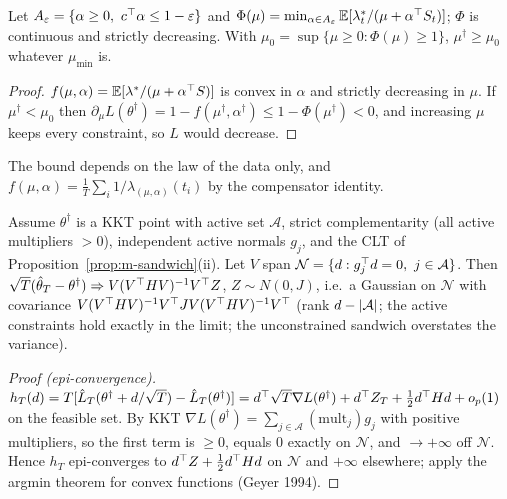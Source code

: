 \begin{proposition}\label{prop:m-mulow}\Pt{}
Let $A_\varepsilon=\{\alpha\ge0,\ c^{\top}\alpha\le1-\varepsilon\}$ and $\Phi(\mu)=\min_{\alpha\in A_\varepsilon}\mathbb{E}[\lambda^*_t/(\mu+\alpha^{\top} S_t)]$; $\Phi$ is continuous and strictly decreasing. With $\mu_0=\sup\{\mu\ge0:\Phi(\mu)\ge1\}$, $\mu^\dagger\ge\mu_0$ whatever $\mu_{\min}$ is.
\end{proposition}
\begin{proof}
$f(\mu,\alpha)=\mathbb{E}[\lambda^*/(\mu+\alpha^{\top} S)]$ is convex in $\alpha$ and strictly decreasing in $\mu$. If $\mu^\dagger<\mu_0$ then $\partial_\mu L(\theta^\dagger)=1-f(\mu^\dagger,\alpha^\dagger)\le1-\Phi(\mu^\dagger)<0$, and increasing $\mu$ keeps every constraint, so $L$ would decrease.
\end{proof}
The bound depends on the law of the data only, and $f(\mu,\alpha)=\tfrac1T\sum_i1/\lambda_{(\mu,\alpha)}(t_i)$ by the compensator identity.

\begin{theorem}\label{thm:m-active}\Ps{}
Assume $\theta^\dagger$ is a KKT point with active set $\mathcal A$, strict complementarity (all active multipliers $>0$), independent active normals $g_j$, and the CLT of Proposition~\ref{prop:m-sandwich}(ii). Let $V$ span $\mathcal N=\{d:g_j^{\top} d=0,\ j\in\mathcal A\}$. Then
$\sqrt T(\hat\theta_T-\theta^\dagger)\Rightarrow V(V^{\top} HV)^{-1}V^{\top} Z$, $Z\sim N(0,J)$, i.e.\ a Gaussian on $\mathcal N$ with covariance $V(V^{\top} HV)^{-1}V^{\top} JV(V^{\top} HV)^{-1}V^{\top}$ (rank $d-\lvert \mathcal A\rvert$; the active constraints hold exactly in the limit; the unconstrained sandwich overstates the variance).
\end{theorem}
\begin{proof}[Proof (epi-convergence)]
$h_T(d)=T[\hat L_T(\theta^\dagger+d/\sqrt T)-\hat L_T(\theta^\dagger)]=d^{\top}\sqrt T\nabla L(\theta^\dagger)+d^{\top} Z_T+\tfrac12d^{\top} Hd+o_p(1)$ on the feasible set. By KKT $\nabla L(\theta^\dagger)=\sum_{j\in\mathcal A}(\text{mult}_j)g_j$ with positive multipliers, so the first term is $\ge0$, equals $0$ exactly on $\mathcal N$, and $\to+\infty$ off $\mathcal N$. Hence $h_T$ epi-converges to $d^{\top} Z+\frac12d^{\top} Hd$ on $\mathcal N$ and $+\infty$ elsewhere; apply the argmin theorem for convex functions (Geyer 1994).
\end{proof}

